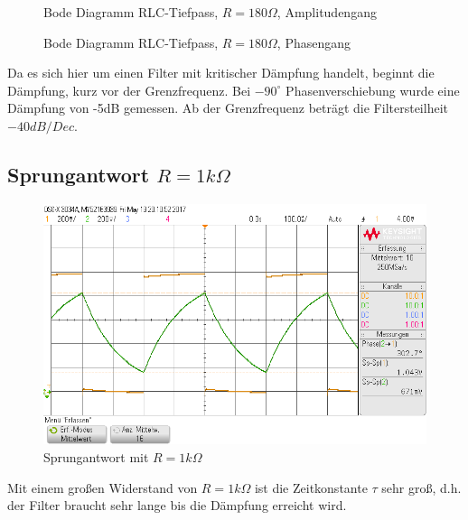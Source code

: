 \begin{figure}[H]
  \centering
  \caption{Bode Diagramm RLC-Tiefpass, $R=180\Omega$, Amplitudengang}
\end{figure}
\begin{figure}[H]
  \centering
  \caption{Bode Diagramm RLC-Tiefpass, $R=180\Omega$, Phasengang}
\end{figure}
Da es sich hier um einen Filter mit kritischer D\"ampfung handelt, beginnt die D\"ampfung, kurz vor der Grenzfrequenz. Bei $-90^\circ$ Phasenverschiebung wurde eine D\"ampfung von -5dB gemessen. Ab der Grenzfrequenz beträgt die Filtersteilheit $-40dB/Dec$.

\subsection{Sprungantwort $R=1k\Omega$}

\begin{figure}[H]
  \begin{center}
    \includegraphics[width=1\textwidth]{./Oszi_Bilder/RLC_Sprung_1k.png}
    \caption{Sprungantwort mit $R=1k\Omega$}
  \end{center}
\end{figure}
\noindent
Mit einem gro\ss{}en Widerstand von $R=1k\Omega$ ist die Zeitkonstante $\tau$ sehr gro\ss{}, d.h. der Filter braucht sehr lange bis die D\"ampfung erreicht wird.

